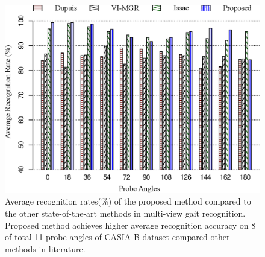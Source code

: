 \begin{figure}[t]
	\centering
	\includegraphics[width = 120mm]{figures/comp_casia_b_multi_view.eps}
	\caption{
		Average recognition rates(\%) of the proposed method compared to the other state-of-the-art methods in multi-view gait recognition. Proposed method achieves higher average recognition accuracy on 8 of total 11 probe angles of CASIA-B dataset compared other methods in literature.
	}
	\label{fig:comp_casia_b_multi_view}
\end{figure}


\endinput